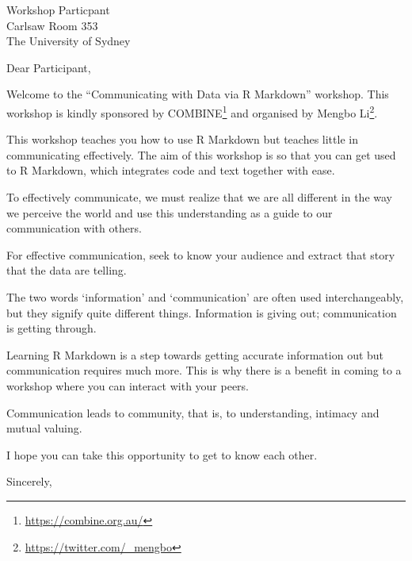 \documentclass[11pt,]{letter}
\date{4th October 2019}
\renewcommand{\href}[2]{#2\footnote{\url{#1}}}
\renewenvironment{quote}{\begin{blockquote}\list{}{\rightmargin=0em\leftmargin=0em}%
\item\relax\color{greytext}\ignorespaces}{\unskip\unskip\endlist\end{blockquote}}
\begin{document}
\begin{letter}{Workshop Particpant\\
Carlsaw Room 353\\
The University of Sydney\\}
\opening{Dear Participant,}

Welcome to the ``Communicating with Data via R Markdown'' workshop. This
workshop is kindly sponsored by \href{https://combine.org.au/}{COMBINE}
and organised by \href{https://twitter.com/_mengbo}{Mengbo Li}.

This workshop teaches you how to use R Markdown but teaches little in
communicating effectively. The aim of this workshop is so that you can
get used to R Markdown, which integrates code and text together with
ease.

\begin{quote}
To effectively communicate, we must realize that we are all different in
the way we perceive the world and use this understanding as a guide to
our communication with others.
\end{quote}

For effective communication, seek to know your audience and extract that
story that the data are telling.

\begin{quote}
The two words `information' and `communication' are often used
interchangeably, but they signify quite different things. Information is
giving out; communication is getting through.
\end{quote}

Learning R Markdown is a step towards getting accurate information out
but communication requires much more. This is why there is a benefit in
coming to a workshop where you can interact with your peers.

\begin{quote}
Communication leads to community, that is, to understanding, intimacy
and mutual valuing.
\end{quote}

I hope you can take this opportunity to get to know each other.

\longindentation=0pt
\closing{Sincerely,}

\end{letter}
\end{document}
